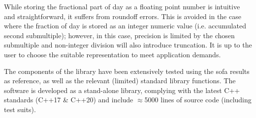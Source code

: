 While storing the fractional part of day as a floating point number is intuitive and 
straightforward, it suffers from roundoff errors. This is avoided in the case where 
the fraction of day is stored as an integer numeric value (i.e. accumulated second 
submultiple); however, in this case, precision is limited by the chosen submultiple 
and non-integer division will also introduce truncation. It is up to the user to 
choose the suitable representation to meet application demands.

The components of the library have been extensively tested using the \gls{sofa} results 
as reference, as well as the relevant (limited) standard library functions. The 
software is developed as a stand-alone library, complying with the latest C++ standards 
(C++17 \& C++20) and include $\approx$5000 lines of source code (including test suits).